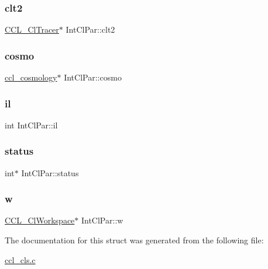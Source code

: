 \subsubsection{\texorpdfstring{clt2}{clt2}}
{\footnotesize\ttfamily \mbox{\hyperlink{struct_c_c_l___cl_tracer}{C\+C\+L\+\_\+\+Cl\+Tracer}}$\ast$ Int\+Cl\+Par\+::clt2}

\mbox{\label{struct_int_cl_par_a23ea5c0ad9cf5813be51906bfe326c7d}} 
\subsubsection{\texorpdfstring{cosmo}{cosmo}}
{\footnotesize\ttfamily \mbox{\hyperlink{structccl__cosmology}{ccl\+\_\+cosmology}}$\ast$ Int\+Cl\+Par\+::cosmo}

\mbox{\label{struct_int_cl_par_aedeff726ecb71019ecc8b5784d825060}} 
\subsubsection{\texorpdfstring{il}{il}}
{\footnotesize\ttfamily int Int\+Cl\+Par\+::il}

\mbox{\label{struct_int_cl_par_abc2ccba43ee24664930d4471badeba83}} 
\subsubsection{\texorpdfstring{status}{status}}
{\footnotesize\ttfamily int$\ast$ Int\+Cl\+Par\+::status}

\mbox{\label{struct_int_cl_par_a1b7adafbc56d9fdb5edbe80c950062b6}} 
\subsubsection{\texorpdfstring{w}{w}}
{\footnotesize\ttfamily \mbox{\hyperlink{struct_c_c_l___cl_workspace}{C\+C\+L\+\_\+\+Cl\+Workspace}}$\ast$ Int\+Cl\+Par\+::w}



The documentation for this struct was generated from the following file\+:\begin{DoxyCompactItemize}
\item 
\mbox{\hyperlink{ccl__cls_8c}{ccl\+\_\+cls.\+c}}\end{DoxyCompactItemize}
